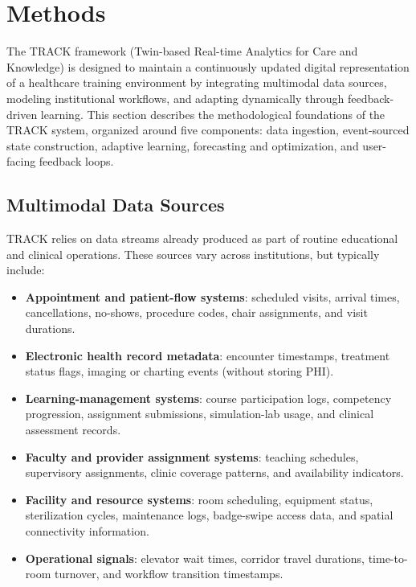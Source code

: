 \documentclass[Afour,sageh,times]{sagej}
\begin{document}
\section{Methods}

The TRACK framework (Twin-based Real-time Analytics for Care and Knowledge) is designed to maintain a continuously updated digital representation of a healthcare training environment by integrating multimodal data sources, modeling institutional workflows, and adapting dynamically through feedback-driven learning. This section describes the methodological foundations of the TRACK system, organized around five components: data ingestion, event-sourced state construction, adaptive learning, forecasting and optimization, and user-facing feedback loops.

\subsection{Multimodal Data Sources}

TRACK relies on data streams already produced as part of routine educational and clinical operations. These sources vary across institutions, but typically include:

\begin{itemize}[leftmargin=*,itemsep=2pt]
    \item \textbf{Appointment and patient-flow systems}: scheduled visits, arrival times, cancellations, no-shows, procedure codes, chair assignments, and visit durations.
    \item \textbf{Electronic health record metadata}: encounter timestamps, treatment status flags, imaging or charting events (without storing PHI).
    \item \textbf{Learning-management systems}: course participation logs, competency progression, assignment submissions, simulation-lab usage, and clinical assessment records.
    \item \textbf{Faculty and provider assignment systems}: teaching schedules, supervisory assignments, clinic coverage patterns, and availability indicators.
    \item \textbf{Facility and resource systems}: room scheduling, equipment status, sterilization cycles, maintenance logs, badge-swipe access data, and spatial connectivity information.
    \item \textbf{Operational signals}: elevator wait times, corridor travel durations, time-to-room turnover, and workflow transition timestamps.
\end{itemize}
\end{document}
